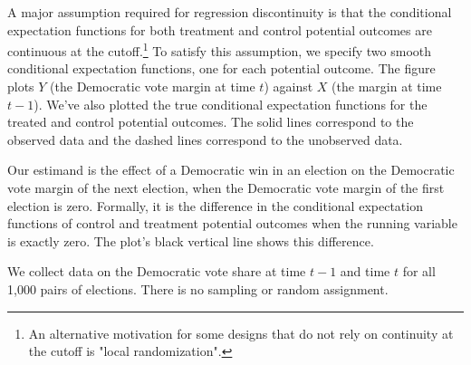 \documentclass[11pt]{article}\usepackage[]{graphicx}\usepackage[]{color}
\newcommand\I{\bigskip\marginnote{\LARGE \sc I \hspace{.02em}}\noindent}
\newcommand\D{\bigskip\marginnote{\LARGE \sc D}\noindent}
\begin{document}
    
A major assumption required for regression discontinuity is that the conditional expectation functions for both treatment and control potential outcomes are continuous at the cutoff.\footnote{An alternative motivation for some designs that do not rely on continuity at the cutoff is "local randomization".} To satisfy this assumption, we specify two smooth conditional expectation functions, one for each potential outcome. The figure plots $Y$ (the Democratic vote margin at time $t$) against $X$ (the margin at time $t-1$). We've also plotted the true conditional expectation functions for the treated and control potential outcomes. The solid lines correspond to the observed data and the dashed lines correspond to the unobserved data.

\I Our estimand is the effect of a Democratic win in an election on the Democratic vote margin of the next election, when the Democratic vote margin of the first election is zero. Formally, it is the difference in the conditional expectation functions of control and treatment potential outcomes when the running variable is exactly zero. The plot's black vertical line shows this difference.

\D  We collect data on the Democratic vote share at time $t-1$ and time $t$ for all 1,000 pairs of elections. There is no sampling or random assignment.
\end{document}
